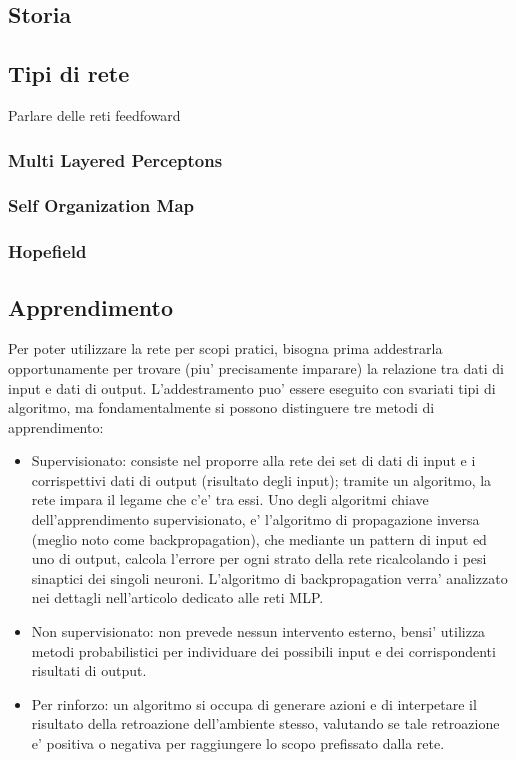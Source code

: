 \documentclass[a4paper,10pt]{book}
\begin{document}

\subsection{Storia}

\subsection{Tipi di rete}
Parlare delle reti feedfoward

\subsubsection{Multi Layered Perceptons}
\subsubsection{Self Organization Map}
\subsubsection{Hopefield}

\subsection{Apprendimento}
Per poter utilizzare la rete per scopi pratici, bisogna prima addestrarla
opportunamente per trovare (piu' precisamente imparare) la relazione
tra dati di input e dati di output. L'addestramento puo' essere
eseguito con svariati tipi di algoritmo, ma fondamentalmente si
possono distinguere tre metodi di apprendimento:

\begin{itemize}
\item Supervisionato: consiste nel proporre alla rete dei set di dati di input e i 
corrispettivi
dati di output (risultato degli input); tramite un algoritmo, la rete
impara il legame che c'e' tra essi.
Uno degli algoritmi chiave dell'apprendimento supervisionato, e' l'algoritmo
di propagazione inversa (meglio noto come backpropagation), che mediante
un pattern di input ed uno di output, calcola l'errore per ogni strato
della rete ricalcolando i pesi sinaptici dei singoli neuroni.
L'algoritmo di backpropagation verra' analizzato nei dettagli
nell'articolo dedicato alle reti MLP.

\item Non supervisionato: non prevede nessun intervento esterno, bensi' utilizza
metodi probabilistici per individuare dei possibili input e dei corrispondenti
risultati di output.

\item Per rinforzo: un algoritmo si occupa di generare azioni e di interpetare il risultato della
retroazione dell'ambiente stesso, valutando se tale retroazione e' positiva
o negativa per raggiungere lo scopo prefissato dalla rete.
\end{itemize}
\end{document}
